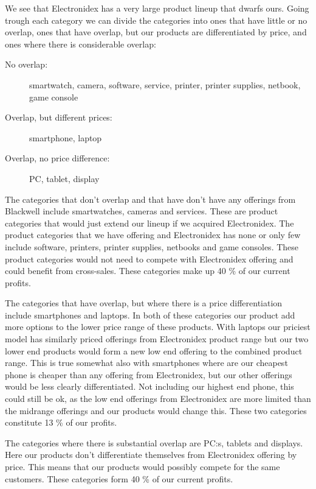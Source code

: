 \documentclass[12pt,a4paper,leqno]{report}
\theoremstyle{plain}
\theoremstyle{definition}
\theoremstyle{remark}
\begin{document}
We see that Electronidex has a very large product lineup that dwarfs ours.
Going trough each category we can divide the categories into ones that have little or no overlap, ones that have overlap,
but our products are differentiated by price, and ones where there is considerable overlap:

\begin{description}
   \item [No overlap:] smartwatch, camera, software, service, printer, printer supplies, netbook, game console
   \item [Overlap, but different prices:] smartphone, laptop
   \item [Overlap, no price difference:] PC, tablet, display
\end{description}

The categories that don't overlap and that have don't have any offerings from Blackwell include smartwatches, cameras
and services. These are product categories that would just extend our lineup if we acquired Electronidex.
The product categories that we have offering and Electronidex has none or only few include software, printers,
printer supplies, netbooks and game consoles. These product categories would not need to compete with Electronidex
offering and could benefit from cross-sales. These categories make up 40 \% of our current profits.

The categories that have overlap, but where there is a price differentiation include smartphones and laptops.
In both of these categories our product add more options to the lower price range of these products. With laptops
our priciest model has similarly priced offerings from Electronidex product range but our two lower end products
would form a new low end offering to the combined product range. This is true somewhat also with smartphones
where are our cheapest phone is cheaper than any offering from Electronidex, but our other offerings
would be less clearly differentiated. Not including our highest end phone, this could still be ok, as the
low end offerings from Electronidex are more limited than the midrange offerings and our products would change this.
These two categories constitute 13 \% of our profits.

The categories where there is substantial overlap are PC:s, tablets and displays. Here our products
don't differentiate themselves from Electronidex offering by price. This means that our products
would possibly compete for the same customers. These categories form 40 \% of our current profits.
\end{document}
